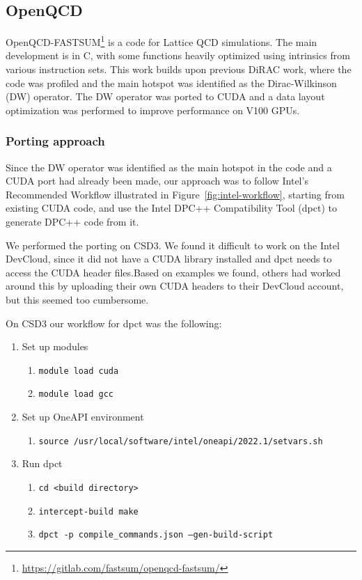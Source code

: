 
\subsection{OpenQCD}\label{sec:openqcd}

OpenQCD-FASTSUM\footnote{\url{https://gitlab.com/fastsum/openqcd-fastsum/}} is a code for Lattice QCD simulations.
The main development is in C, with some functions heavily optimized using intrinsics from various instruction sets.
This work builds upon previous DiRAC work, where the code was profiled and the main hotspot was identified as the Dirac-Wilkinson (DW) operator.
The DW operator was ported to CUDA and a data layout optimization was performed to improve performance on V100 GPUs.

\subsubsection{Porting approach}\label{sec:openqcd_porting}

Since the DW operator was identified as the main hotspot in the code and a CUDA port had already been made, our approach was to follow Intel's Recommended Workflow illustrated in Figure~\ref{fig:intel-workflow}, starting from existing CUDA code, and use the Intel DPC++ Compatibility Tool (dpct) to generate DPC++ code from it.

We performed the porting on CSD3.
We found it difficult to work on the Intel DevCloud, since it did not have a CUDA library installed and dpct needs to access the CUDA header files.Based on examples we found, others had worked around this by uploading their own CUDA headers to their DevCloud account, but this seemed too cumbersome.

On CSD3 our workflow for dpct was the following:

\begin{enumerate}
	\item Set up modules
	      \begin{enumerate}
		      \item\texttt{module load cuda}
		      \item\texttt{module load gcc}
	      \end{enumerate}
	\item Set up OneAPI environment
	      \begin{enumerate}
		      \item\texttt{source /usr/local/software/intel/oneapi/2022.1/setvars.sh}
	      \end{enumerate}
	\item Run dpct
	      \begin{enumerate}
		      \item\texttt{cd <build directory>}
		      \item\texttt{intercept-build make}
		      \item\texttt{dpct -p compile\_commands.json --gen-build-script}
	      \end{enumerate}
\end{enumerate}

